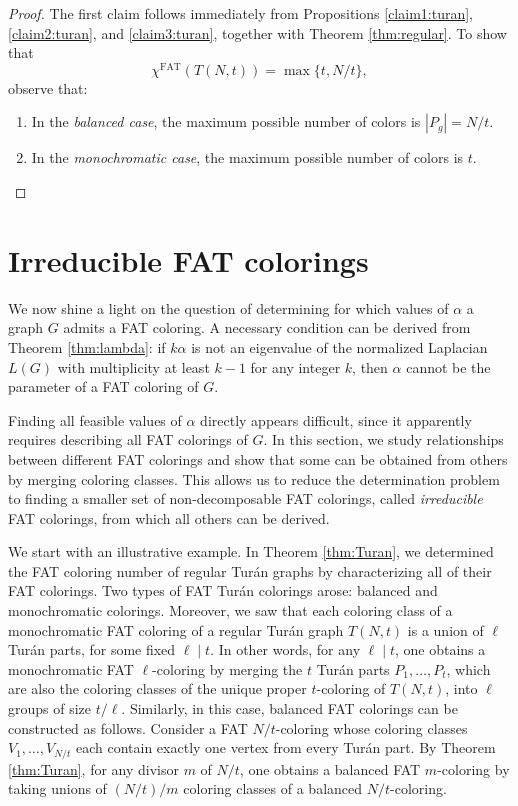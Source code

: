 \documentclass{article}
\theoremstyle{plain}
\theoremstyle{definition}
\theoremstyle{remark}
\begin{document}
\begin{proof} The first claim follows immediately from Propositions \ref{claim1:turan}, \ref{claim2:turan}, and \ref{claim3:turan}, together with Theorem \ref{thm:regular}. To show that $$\chi^{\textrm{FAT}}(T(N,t))=\max\{t,N/t\},$$ observe that:

\begin{enumerate}
    \item In the \emph{balanced case}, the maximum possible number of colors is $|P_g|=N/t$.
    \item In the \emph{monochromatic case}, the maximum possible number of colors is $t$.
\end{enumerate}
\end{proof}


\section{Irreducible FAT colorings}\label{section:irr}
We now shine a light on the question of determining for which values of $\alpha$ a graph $G$ admits a FAT coloring. A necessary condition can be derived from Theorem \ref{thm:lambda}: if $k\alpha$ is not an eigenvalue of the normalized Laplacian $L(G)$ with multiplicity at least $k-1$ for any integer $k$, then $\alpha$ cannot be the parameter of a FAT coloring of $G$.

Finding all feasible values of $\alpha$ directly appears difficult, since it apparently requires describing all FAT colorings of $G$. In this section, we study relationships between different FAT colorings and show that some can be obtained from others by merging coloring classes. This allows us to reduce the determination problem to finding a smaller set of non-decomposable FAT colorings, called \emph{irreducible} FAT colorings, from which all others can be derived.

We start with an illustrative example.
In Theorem \ref{thm:Turan}, we determined the FAT coloring number of regular Turán graphs by characterizing all of their FAT colorings. Two types of FAT Turán colorings arose: balanced and monochromatic colorings. Moreover, we saw that each coloring class of a monochromatic FAT coloring of a regular Turán graph $T(N,t)$  is a union of $\ell$ Turán parts, for some fixed $\ell\mid t$. In other words, for any $\ell\mid t$, one obtains a monochromatic FAT $\ell$-coloring by merging the $t$ Turán parts $P_1,\ldots,P_t$, which are also the coloring classes of the unique proper $t$-coloring of $T(N,t)$, into $\ell$ groups of size $t/\ell$. Similarly, in this case, balanced FAT colorings can be constructed as follows. Consider a FAT $N/t$-coloring whose coloring classes $V_1,\ldots,V_{N/t}$ each contain exactly one vertex from every Turán part. By Theorem \ref{thm:Turan}, for any divisor $m$ of $N/t$, one obtains a balanced FAT $m$-coloring by taking unions of $(N/t)/m$ coloring classes of a balanced $N/t$-coloring.
\end{document}
